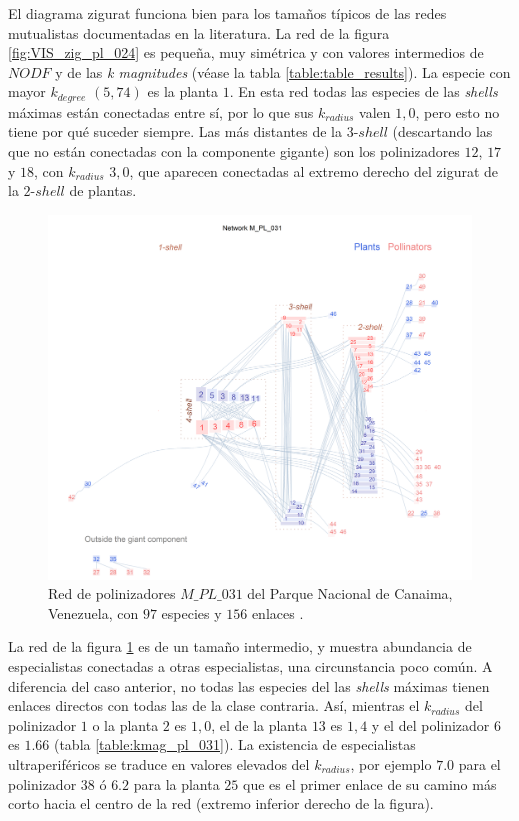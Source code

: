 El diagrama zigurat funciona bien para los tamaños típicos de las redes mutualistas documentadas en la literatura. La red de la figura \ref{fig:VIS_zig_pl_024} es pequeña, muy simétrica y con valores intermedios de $NODF$ y de las \textit{k magnitudes} (véase la tabla \ref{table:table_results}). La especie con mayor $k_{degree}$ $(5,74)$ es la planta $1$. En esta red todas las especies de las \textit{shells} máximas están conectadas entre sí, por lo que sus $k_{radius}$ valen $1,0$, pero esto no tiene por qué suceder siempre. Las más distantes de la $3$-$shell$ (descartando las que no están conectadas con la componente gigante) son los polinizadores $12$, $17$ y $18$, con  $k_{radius}$ $3,0$, que aparecen conectadas al extremo derecho del zigurat de la $2$-$shell$ de plantas.

\begin{figure}[h!]
\centering
\includegraphics[scale=1]{Figures/VIS_M_PL_031_ziggurat.png}
\caption {Red de polinizadores $M\_PL\_031$ del Parque Nacional de Canaima, Venezuela, con $97$ especies y $156$ enlaces \cite{ramirez1989biologia}.}
\label{fig:VIS_M_PL_031_ziggurat}
\end{figure}

La red de la figura \ref{fig:VIS_M_PL_031_ziggurat} es de un tamaño intermedio, y muestra abundancia de especialistas conectadas a otras especialistas, una circunstancia poco común. A diferencia del caso anterior, no todas las especies del las \textit{shells} máximas tienen enlaces directos con todas las de la clase contraria. Así, mientras el $k_{radius}$ del polinizador $1$ o la planta $2$ es $1,0$, el de la planta $13$ es $1,4$ y el del polinizador $6$ es $1.66$ (tabla \ref{table:kmag_pl_031}). La existencia de especialistas ultraperiféricos se traduce en valores elevados del $k_{radius}$, por ejemplo $7.0$ para el polinizador $38$ ó $6.2$ para la planta $25$ que es el primer enlace de su camino más corto hacia el centro de la red (extremo inferior derecho de la figura).

